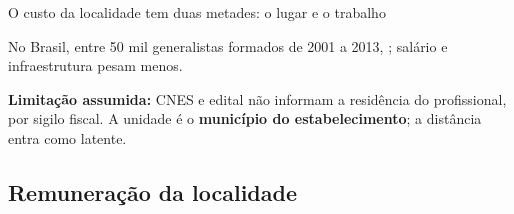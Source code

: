 \documentclass[aspectratio=169,10pt]{beamer}
\begin{document}
\begin{frame}{O custo da localidade tem duas metades: o lugar e o trabalho}
{    \vspace{0.3em}
    {\small No Brasil, entre 50 mil generalistas formados de 2001 a 2013,
    ; salário e infraestrutura pesam menos.}

    \vspace{0.3em}
    {\footnotesize \textbf{Limitação assumida:} CNES e edital não informam a
    residência do profissional, por sigilo fiscal. A unidade é o
    \textbf{município do estabelecimento}; a distância entra como latente.}
  }%

\end{frame}

\subsection{Remuneração da localidade}
\end{document}
